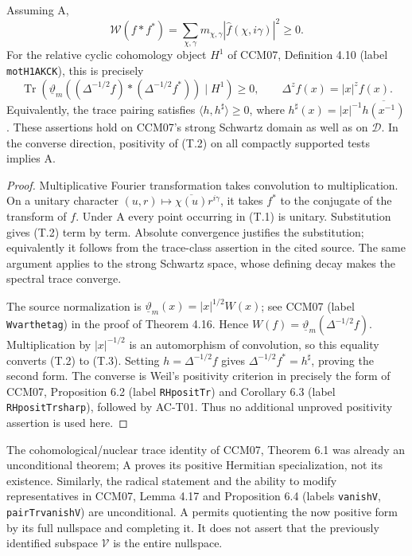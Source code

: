 \begin{theorem}
\label{AC-T02}
Assuming A,
\[
 \mathcal W(f*f^*)=
 \sum_{\chi,\gamma}m_{\chi,\gamma}
          |\widehat f(\chi,i\gamma)|^2\geq0.             \tag{T.2}
\]
For the relative cyclic cohomology object \(H^1\) of CCM07,
Definition 4.10 (label \texttt{motH1AKCK}), this is precisely
\[
 \operatorname{Tr}\!
 \left(\underline\vartheta_m
       ((\Delta^{-1/2}f)*(\Delta^{-1/2}f^*))\mid H^1\right)
       \geq0,\qquad \Delta^z f(x)=|x|^z f(x).             \tag{T.3}
\]
Equivalently, the trace pairing satisfies
\(\langle h,h^\sharp\rangle\geq0\), where
\(h^\sharp(x)=|x|^{-1}\overline{h(x^{-1})}\).
These assertions hold on CCM07's strong Schwartz domain as well
as on \(\mathcal D\). In the converse direction, positivity of
(T.2) on all compactly supported tests implies A.
\end{theorem}

\begin{proof}
Multiplicative Fourier transformation takes convolution to
multiplication. On a unitary character \((u,r)\mapsto
\overline{\chi(u)}r^{i\gamma}\), it takes \(f^*\) to the conjugate of the
transform of \(f\). Under A every point occurring in (T.1) is
unitary. Substitution gives (T.2) term by term. Absolute
convergence justifies the substitution; equivalently it follows
from the trace-class assertion in the cited source. The same
argument applies to the strong Schwartz space, whose defining
decay makes the spectral trace converge.

The source normalization is
\(\underline\vartheta_m(x)=|x|^{1/2}W(x)\);
see CCM07 (label \texttt{Wvarthetag}) in the proof of
Theorem 4.16. Hence
\(W(f)=\underline\vartheta_m(\Delta^{-1/2}f)\).
Multiplication by \(|x|^{-1/2}\) is an automorphism of convolution,
so this equality converts (T.2) to (T.3).
Setting \(h=\Delta^{-1/2}f\) gives
\(\Delta^{-1/2}f^*=h^\sharp\), proving the second form.
The converse is Weil's positivity criterion in precisely the
form of CCM07, Proposition 6.2
(label \texttt{RHpositTr}) and Corollary 6.3
(label \texttt{RHpositTrsharp}), followed by AC-T01.
Thus no additional unproved positivity assertion is used here.
\end{proof}

The cohomological/nuclear trace identity of CCM07, Theorem 6.1
was already an unconditional theorem; A proves its positive
Hermitian specialization, not its existence. Similarly, the
radical statement and the ability to modify representatives
in CCM07, Lemma 4.17 and Proposition 6.4
(labels \texttt{vanishV}, \texttt{pairTrvanishV}) are
unconditional. A permits quotienting the now positive form
by its full nullspace and completing it. It does not assert
that the previously identified subspace \(\mathcal V\) is
the entire nullspace.

